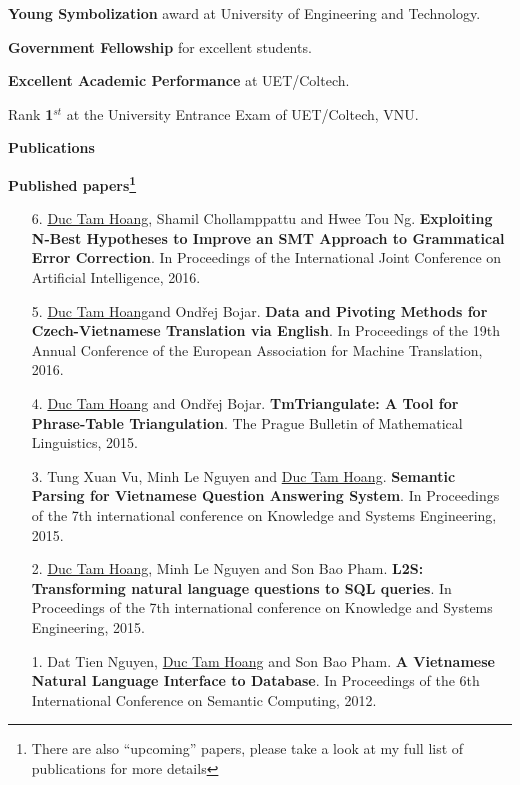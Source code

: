 \documentclass[9pt]{extreport}
\newcommand{\makechapter}[1]%
	{\hspace*{-\marginparsep minus \marginparwidth}%
		\phantomsection\addcontentsline{toc}{section}{#1}%
		\begin{minipage}[t]{\textwidth+\marginparwidth+\marginparsep}%
			\vspace{3 mm}
			{\large \bfseries #1}%
		\end{minipage}}
\begin{document}
			\textbf{Young Symbolization} award at University of Engineering and Technology.
			
			\textbf{Government Fellowship} for excellent students.
			
			\textbf{Excellent Academic Performance} at UET/Coltech.
			
			Rank \textbf{1$^{st}$} at the University Entrance Exam of UET/Coltech, VNU.
			
			
			\makechapter{Publications}
			
			\textbf{Published papers\footnote{There are also ``upcoming'' papers, please take a look at my full list of publications for more details}}
			\begin{enumerate}
				
				\item[6.] \underline{Duc Tam Hoang}, Shamil Chollamppattu and  Hwee Tou Ng. \textbf{Exploiting N-Best Hypotheses to Improve an SMT Approach to Grammatical Error Correction}. In Proceedings of the International Joint Conference on Artificial Intelligence, 2016.
				
				\item[5.] \underline{Duc Tam Hoang}and Ond\v{r}ej Bojar. \textbf{Data and Pivoting Methods for Czech-Vietnamese Translation via English}. In Proceedings of the 19th Annual Conference of the European Association for Machine Translation, 2016.
				
				\item[4.] \underline{Duc Tam Hoang} and Ond\v{r}ej Bojar. \textbf{TmTriangulate: A Tool for Phrase-Table Triangulation}. The Prague Bulletin of Mathematical Linguistics, 2015.
				
				\item[3.] Tung Xuan Vu, Minh Le Nguyen and \underline{Duc Tam Hoang}. \textbf{Semantic Parsing for Vietnamese Question Answering System}. In Proceedings of the 7th international conference on Knowledge and Systems Engineering, 2015.
				
				\item[2.] \underline{Duc Tam Hoang}, Minh Le Nguyen and Son Bao Pham. \textbf{L2S: Transforming natural language questions to SQL queries}. In Proceedings of the 7th international conference on Knowledge and Systems Engineering, 2015.
				
				\item[1.] Dat Tien Nguyen, \underline{Duc Tam Hoang} and Son Bao Pham. \textbf{A Vietnamese Natural Language Interface to Database}. In Proceedings of the 6th International Conference on Semantic Computing, 2012.
			\end{enumerate}
			
\end{document}
